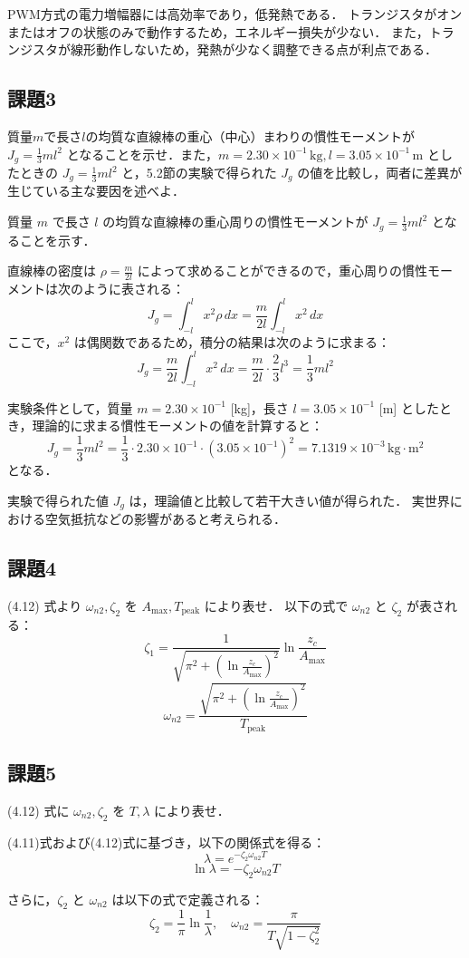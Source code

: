 PWM方式の電力増幅器には高効率であり，低発熱である．
トランジスタがオンまたはオフの状態のみで動作するため，エネルギー損失が少ない．
また，トランジスタが線形動作しないため，発熱が少なく調整できる点が利点である．


\subsection*{課題3}
質量$m$で長さ$l$の均質な直線棒の重心（中心）まわりの慣性モーメントが $J_g = \frac{1}{3}ml^2$ となることを示せ．また，$m = 2.30 \times 10^{-1} \, \mathrm{kg}, l = 3.05 \times 10^{-1} \, \mathrm{m}$ としたときの $J_g = \frac{1}{3}ml^2$ と，5.2節の実験で得られた $J_g$ の値を比較し，両者に差異が生じている主な要因を述べよ．


質量 \(m\) で長さ \(l\) の均質な直線棒の重心周りの慣性モーメントが \(J_g = \frac{1}{3}ml^2\) となることを示す．

直線棒の密度は \(\rho = \frac{m}{2l}\) によって求めることができるので，重心周りの慣性モーメントは次のように表される：
\[
  J_g = \int_{-l}^{l} x^2 \rho \, dx = \frac{m}{2l} \int_{-l}^{l} x^2 \, dx
\]
ここで，\(x^2\) は偶関数であるため，積分の結果は次のように求まる：
\[
  J_g = \frac{m}{2l} \int_{-l}^{l} x^2 \, dx = \frac{m}{2l} \cdot \frac{2}{3} l^3 = \frac{1}{3} ml^2
\]

実験条件として，質量 \(m = 2.30 \times 10^{-1}\) [kg]，長さ \(l = 3.05 \times 10^{-1}\) [m] としたとき，理論的に求まる慣性モーメントの値を計算すると：
\[
  J_g = \frac{1}{3}ml^2 = \frac{1}{3} \cdot 2.30 \times 10^{-1} \cdot (3.05 \times 10^{-1})^2 = 7.1319 \times 10^{-3} \, \text{kg} \cdot \text{m}^2
\]
となる．

実験で得られた値 \(J_g\) は，理論値と比較して若干大きい値が得られた．
実世界における空気抵抗などの影響があると考えられる．

\subsection*{課題4}
(4.12) 式より $\omega_{n2}, \zeta_2$ を $A_{\max}, T_{\text{peak}}$ により表せ．
以下の式で $\omega_{n2}$ と $\zeta_2$ が表される：
\[
  \zeta_1 = \frac{1}{\sqrt{\pi^2 + \left( \ln \frac{z_c}{A_{\max}} \right)^2}} \ln \frac{z_c}{A_{\max}}
\]
\[
  \omega_{n2} = \frac{\sqrt{\pi^2 + \left( \ln \frac{z_c}{A_{\max}} \right)^2}}{T_{\text{peak}}}
\]

\subsection*{課題5}
(4.12) 式に $\omega_{n2}, \zeta_2$ を $T, \lambda$ により表せ．

(4.11)式および(4.12)式に基づき，以下の関係式を得る：
\[
  \lambda = e^{-\zeta_2 \omega_{n2} T}
\]
\[
  \ln \lambda = -\zeta_2 \omega_{n2} T
\]

さらに，$\zeta_2$ と $\omega_{n2}$ は以下の式で定義される：
\[
  \zeta_2 = \frac{1}{\pi} \ln \frac{1}{\lambda}, \quad \omega_{n2} = \frac{\pi}{T \sqrt{1 - \zeta_2^2}}
\]
